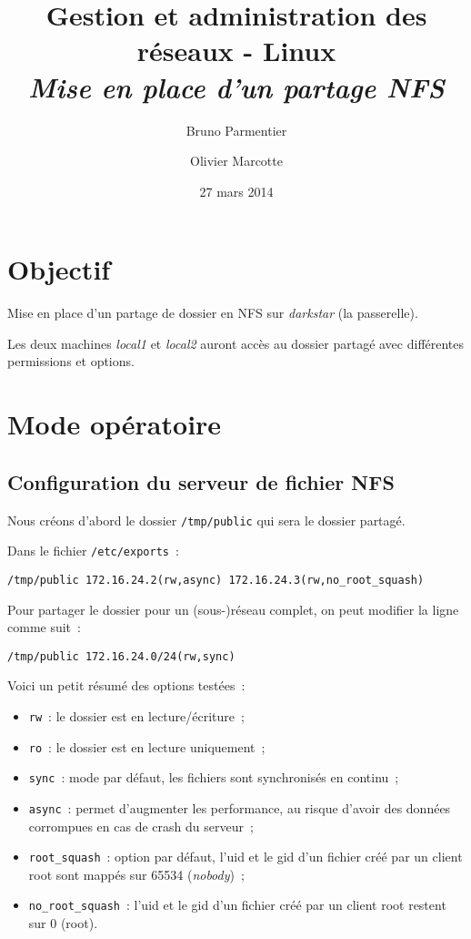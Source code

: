 \documentclass[11pt,a4paper,oneside]{article}
\author{Bruno Parmentier \and Olivier Marcotte}
\title{Gestion et administration des réseaux - Linux \\[1cm] \emph{Mise en place
d'un partage NFS}}
\date{27 mars 2014}
\begin{document}
\begin{titlepage}
    \maketitle
    \thispagestyle{empty}
\end{titlepage}

\section{Objectif}
Mise en place d'un partage de dossier en NFS sur \emph{darkstar} (la
passerelle).

Les deux machines \emph{local1} et \emph{local2} auront accès au dossier partagé
avec différentes permissions et options.

\section{Mode opératoire}

\subsection{Configuration du serveur de fichier NFS}
Nous créons d'abord le dossier \verb#/tmp/public# qui sera le dossier partagé.

Dans le fichier \verb#/etc/exports#~:
\begin{verbatim}
/tmp/public 172.16.24.2(rw,async) 172.16.24.3(rw,no_root_squash)
\end{verbatim}

Pour partager le dossier pour un (sous-)réseau complet, on peut modifier la
ligne comme suit~:
\begin{verbatim}
/tmp/public 172.16.24.0/24(rw,sync)
\end{verbatim}

Voici un petit résumé des options testées~:
\begin{itemize}
    \item \verb#rw#~: le dossier est en lecture/écriture~;
    \item \verb#ro#~: le dossier est en lecture uniquement~;
    \item \verb#sync#~: mode par défaut, les fichiers sont synchronisés en
        continu~;
    \item \verb#async#~: permet d'augmenter les performance, au risque d'avoir
        des données corrompues en cas de crash du serveur~;
    \item \verb#root_squash#~: option par défaut, l'uid et le gid d'un fichier
        créé par un client root sont mappés sur 65534 (\emph{nobody})~;
    \item \verb#no_root_squash#~: l'uid et le gid d'un fichier créé par un
        client root restent sur 0 (root).
\end{itemize}
\end{document}
